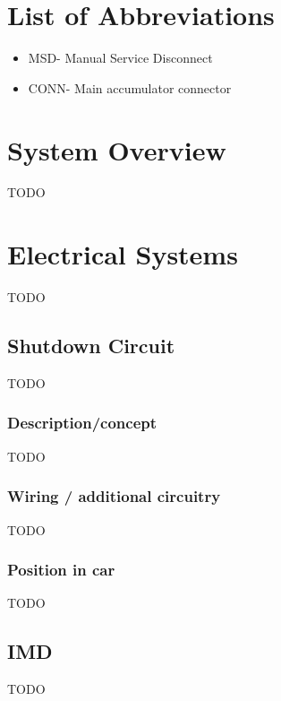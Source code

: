 \documentclass{article}
\begin{document}
\tableofcontents
{}

\newpage
\listoffigures
{}

\newpage
\listoftables
{}

\newpage
\section*{List of Abbreviations}
\begin{itemize}
    \item MSD- Manual Service Disconnect
    \item CONN- Main accumulator connector
\end{itemize}

\setlength{\parindent}{0pt}

\newpage
{}

\section{System Overview}
TODO

\section{Electrical Systems}
TODO

\subsection{Shutdown Circuit}
TODO

\subsubsection{Description/concept}
TODO

\subsubsection{Wiring / additional circuitry}
TODO

\subsubsection{Position in car}
TODO

\subsection{IMD}
TODO
\end{document}
